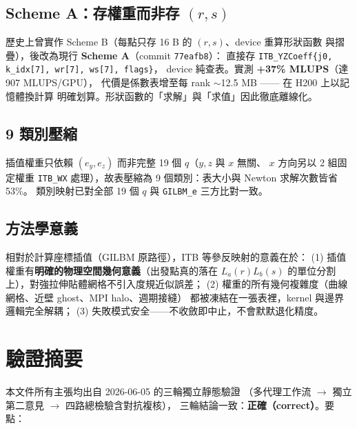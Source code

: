 \documentclass[11pt,a4paper]{article}
\newcommand{\code}[1]{\texttt{#1}}
\begin{document}
\subsection{Scheme A：存權重而非存 $(r,s)$}
歷史上曾實作 Scheme B（每點只存 16 B 的 $(r,s)$、device 重算形狀函數
與摺疊），後改為現行 \textbf{Scheme A}（commit \code{77eafb8}）：
直接存 \code{ITB\_YZCoeff\{j0, k\_idx[7], wr[7], ws[7], flags\}}，
device 純查表。實測 \textbf{+37\% MLUPS}（達 907 MLUPS/GPU），
代價是係數表增至每 rank $\sim$12.5 MB —— 在 H200 上以記憶體換計算
明確划算。形狀函數的「求解」與「求值」因此徹底離線化。

\subsection{9 類別壓縮}
插值權重只依賴 $(e_y,e_z)$ 而非完整 19 個 $q$（$y,z$ 與 $x$ 無關、
$x$ 方向另以 2 組固定權重 \code{ITB\_WX} 處理），故表壓縮為
9 個類別：表大小與 Newton 求解次數皆省 53\%。
類別映射已對全部 19 個 $q$ 與 \code{GILBM\_e} 三方比對一致。

\subsection{方法學意義}
相對於計算座標插值（GILBM 原路徑），ITB 等參反映射的意義在於：
(1) 插值權重有\textbf{明確的物理空間幾何意義}（出發點真的落在
$L_a(r)L_b(s)$ 的單位分割上），對強拉伸貼體網格不引入度規近似誤差；
(2) 權重的所有幾何複雜度（曲線網格、近壁 ghost、MPI halo、週期接縫）
都被凍結在一張表裡，kernel 與邊界邏輯完全解耦；
(3) 失敗模式安全——不收斂即中止，不會默默退化精度。

\section{驗證摘要}
\label{sec:verify}
本文件所有主張均出自 2026-06-05 的三輪獨立靜態驗證
（多代理工作流 $\to$ 獨立第二意見 $\to$ 四路總檢驗含對抗複核），
三輪結論一致：\textbf{正確（correct）}。要點：
\end{document}
